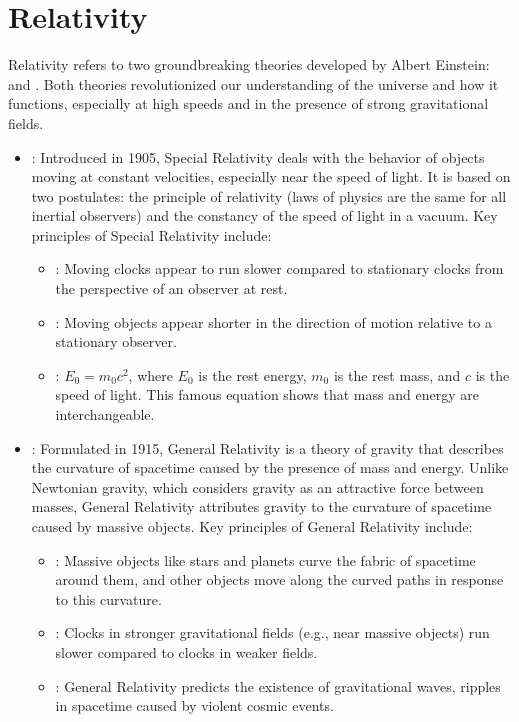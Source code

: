 \chapter{Relativity}
\thispagestyle{fancy}

Relativity refers to two groundbreaking theories developed by Albert Einstein:  and . Both theories revolutionized our understanding of the universe and how it functions, especially at high speeds and in the presence of strong gravitational fields.

\begin{itemize}
	\item {}: Introduced in 1905, Special Relativity deals with the behavior of objects moving at constant velocities, especially near the speed of light. It is based on two postulates: the principle of relativity (laws of physics are the same for all inertial observers) and the constancy of the speed of light in a vacuum. Key principles of Special Relativity include:
	\begin{itemize}
		\item {}: Moving clocks appear to run slower compared to stationary clocks from the perspective of an observer at rest.
		\item {}: Moving objects appear shorter in the direction of motion relative to a stationary observer.
		\item {}: $E_0=m_0c^2$, where $E_0$ is the rest energy, $m_0$ is the rest mass, and $c$ is the speed of light. This famous equation shows that mass and energy are interchangeable.
	\end{itemize}

	\item {}: Formulated in 1915, General Relativity is a theory of gravity that describes the curvature of spacetime caused by the presence of mass and energy. Unlike Newtonian gravity, which considers gravity as an attractive force between masses, General Relativity attributes gravity to the curvature of spacetime caused by massive objects. Key principles of General Relativity include:
	\begin{itemize}
		\item {}: Massive objects like stars and planets curve the fabric of spacetime around them, and other objects move along the curved paths in response to this curvature.
		\item {}: Clocks in stronger gravitational fields (e.g., near massive objects) run slower compared to clocks in weaker fields.
		\item {}: General Relativity predicts the existence of gravitational waves, ripples in spacetime caused by violent cosmic events.
	\end{itemize}
\end{itemize}


